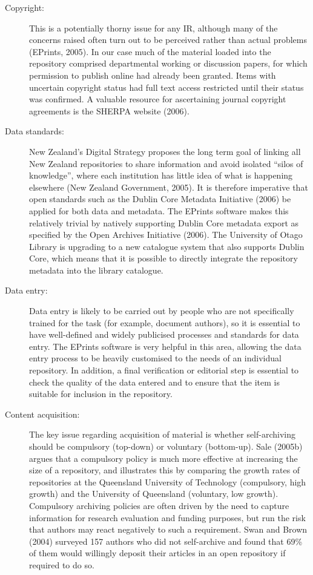 \documentclass[12pt,pdftex,a4paper,titlepage]{article}
\begin{document}
\begin{description}

	\item[Copyright:] This is a potentially thorny issue for any IR, although many of the concerns raised often turn out to be perceived rather than actual problems (EPrints, 2005). In our case much of the material loaded into the repository comprised departmental working or discussion papers, for which permission to publish online had already been granted. Items with uncertain copyright status had full text access restricted until their status was confirmed. A valuable resource for ascertaining journal copyright agreements is the SHERPA website (2006).

	\item[Data standards:] New Zealand's Digital Strategy proposes the long term goal of linking all New Zealand repositories to share information and avoid isolated ``silos of knowledge'', where each institution has little idea of what is happening elsewhere (New Zealand Government, 2005). It is therefore imperative that open standards such as the Dublin Core Metadata Initiative (2006) be applied for both data and metadata. The EPrints software makes this relatively trivial by natively supporting Dublin Core metadata export as specified by the Open Archives Initiative (2006). The University of Otago Library is upgrading to a new catalogue system that also supports Dublin Core, which means that it is possible to directly integrate the repository metadata into the library catalogue.

	\item[Data entry:] Data entry is likely to be carried out by people who are not specifically trained for the task (for example, document authors), so it is essential to have well-defined and widely publicised processes and standards for data entry. The EPrints software is very helpful in this area, allowing the data entry process to be heavily customised to the needs of an individual repository. In addition, a final verification or editorial step is essential to check the quality of the data entered and to ensure that the item is suitable for inclusion in the repository.

	\item[Content acquisition:] The key issue regarding acquisition of material is whether self-archiving should be compulsory (top-down) or voluntary (bottom-up). Sale (2005b) argues that a compulsory policy is much more effective at increasing the size of a repository, and illustrates this by comparing the growth rates of repositories at the Queensland University of Technology (compulsory, high growth) and the University of Queensland (voluntary, low growth). Compulsory archiving policies are often driven by the need to capture information for research evaluation and funding purposes, but run the risk that authors may react negatively to such a requirement. Swan and Brown (2004) surveyed 157 authors who did not self-archive and found that 69\% of them would willingly deposit their articles in an open repository if required to do so.


\end{description}
\end{document}

